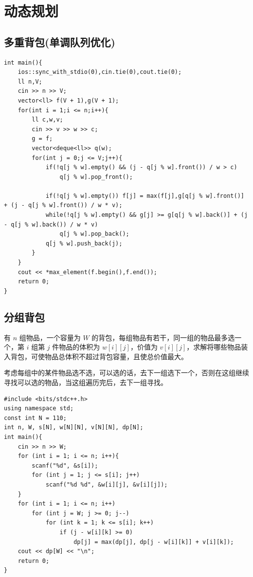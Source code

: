 
\section{动态规划}
\subsection{多重背包(单调队列优化)}
\begin{lstlisting}[caption={}]
int main(){
    ios::sync_with_stdio(0),cin.tie(0),cout.tie(0);
    ll n,V;
    cin >> n >> V;
    vector<ll> f(V + 1),g(V + 1);
    for(int i = 1;i <= n;i++){
        ll c,w,v;
        cin >> v >> w >> c;
        g = f;
        vector<deque<ll>> q(w);
        for(int j = 0;j <= V;j++){
            if(!q[j % w].empty() && (j - q[j % w].front()) / w > c)
                q[j % w].pop_front();
            
            if(!q[j % w].empty()) f[j] = max(f[j],g[q[j % w].front()] + (j - q[j % w].front()) / w * v);
            while(!q[j % w].empty() && g[j] >= g[q[j % w].back()] + (j - q[j % w].back()) / w * v)
                q[j % w].pop_back();
            q[j % w].push_back(j);
        }
    }
    cout << *max_element(f.begin(),f.end());
    return 0;
}
\end{lstlisting}

\subsection{分组背包}
有 $n$ 组物品，一个容量为 $W$ 的背包，每组物品有若干，同一组的物品最多选一个，第 $i$ 组第 $j$ 件物品的体积为 $w[i][j]$，价值为 $v[i][j]$，求解将哪些物品装入背包，可使物品总体积不超过背包容量，且使总价值最大。

考虑每组中的某件物品选不选，可以选的话，去下一组选下一个，否则在这组继续寻找可以选的物品，当这组遍历完后，去下一组寻找。
\begin{lstlisting}[caption={}]
#include <bits/stdc++.h>
using namespace std;
const int N = 110;
int n, W, s[N], w[N][N], v[N][N], dp[N];
int main(){
    cin >> n >> W;
    for (int i = 1; i <= n; i++){
        scanf("%d", &s[i]);
        for (int j = 1; j <= s[i]; j++)
            scanf("%d %d", &w[i][j], &v[i][j]);
    }
    for (int i = 1; i <= n; i++)
        for (int j = W; j >= 0; j--)
            for (int k = 1; k <= s[i]; k++)
                if (j - w[i][k] >= 0)
                    dp[j] = max(dp[j], dp[j - w[i][k]] + v[i][k]);
    cout << dp[W] << "\n";
    return 0;
}
\end{lstlisting}

